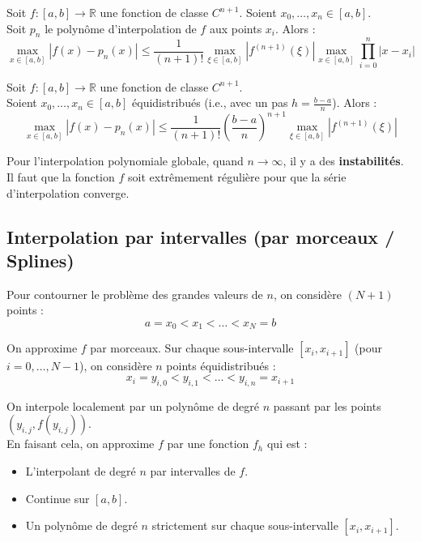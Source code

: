 \begin{theoreme}
Soit $f : [a,b] \to \mathbb{R}$ une fonction de classe $C^{n+1}$. Soient $x_0, \dots, x_n \in [a,b]$. \\
Soit $p_n$ le polynôme d'interpolation de $f$ aux points $x_i$. Alors :
$$\max_{x\in[a,b]} |f(x) - p_n(x)| \le \frac{1}{(n+1)!} \max_{\xi\in[a,b]} |f^{(n+1)}(\xi)| \max_{x\in[a,b]} \prod_{i=0}^n |x - x_i|$$
\end{theoreme}

\begin{theoreme}
Soit $f : [a,b] \to \mathbb{R}$ une fonction de classe $C^{n+1}$. \\
Soient $x_0, \dots, x_n \in [a,b]$ équidistribués (i.e., avec un pas $h = \frac{b-a}{n}$). Alors :
$$\max_{x\in[a,b]} |f(x) - p_n(x)| \le \frac{1}{(n+1)!} \left(\frac{b-a}{n}\right)^{n+1} \max_{\xi\in[a,b]} |f^{(n+1)}(\xi)|$$
\end{theoreme}

\begin{remarque}
Pour l'interpolation polynomiale globale, quand $n \to \infty$, il y a des \textbf{instabilités}. Il faut que la fonction $f$ soit extrêmement régulière pour que la série d'interpolation converge.
\end{remarque}

\subsection{Interpolation par intervalles (par morceaux / Splines)}

Pour contourner le problème des grandes valeurs de $n$, on considère $(N+1)$ points :
$$a = x_0 < x_1 < \dots < x_N = b$$

On approxime $f$ par morceaux. Sur chaque sous-intervalle $[x_i, x_{i+1}]$ (pour $i=0,\dots,N-1$), on considère $n$ points équidistribués :
$$x_i = y_{i,0} < y_{i,1} < \dots < y_{i,n} = x_{i+1}$$

On interpole localement par un polynôme de degré $n$ passant par les points $(y_{i,j}, f(y_{i,j}))$. \\
En faisant cela, on approxime $f$ par une fonction $f_h$ qui est :
\begin{itemize}
    \item L'interpolant de degré $n$ par intervalles de $f$.
    \item Continue sur $[a,b]$.
    \item Un polynôme de degré $n$ strictement sur chaque sous-intervalle $[x_i, x_{i+1}]$.
\end{itemize}

